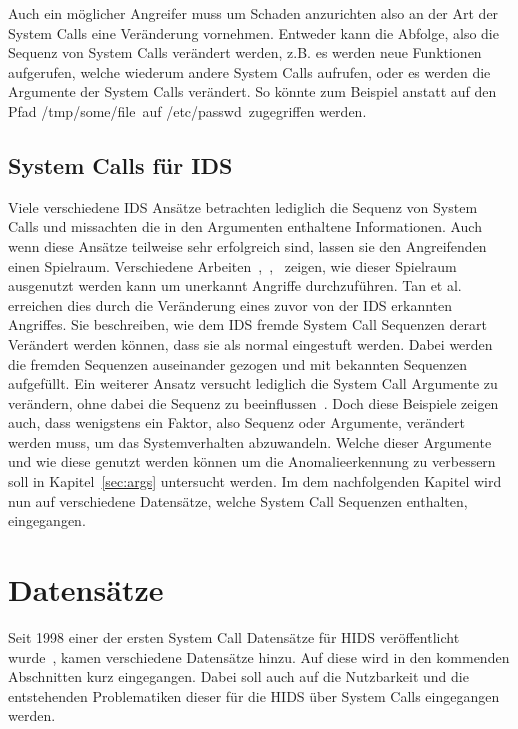         Auch ein möglicher Angreifer muss um Schaden anzurichten also an der Art der System Calls eine Veränderung vornehmen.
        Entweder kann die Abfolge, also die Sequenz von System Calls verändert werden, z.B. es werden neue Funktionen aufgerufen, welche wiederum andere System Calls aufrufen,
        oder es werden die Argumente der System Calls verändert.
        So könnte zum Beispiel anstatt auf den Pfad \glqq /tmp/some/file\grqq \ auf \glqq /etc/passwd\grqq \ zugegriffen werden. 

        \subsection{System Calls für IDS}
            Viele verschiedene IDS Ansätze betrachten lediglich die Sequenz von System Calls und missachten die in den Argumenten enthaltene Informationen.
            Auch wenn diese Ansätze teilweise sehr erfolgreich sind, lassen sie den Angreifenden einen Spielraum.
            Verschiedene Arbeiten~\cite{Syscallseqexploit1},~\cite{Syscallseqexploit2},~\cite{Syscallseqexploit3} zeigen, wie dieser Spielraum ausgenutzt werden kann um unerkannt Angriffe durchzuführen. 
            Tan et al.~\cite{Syscallseqexploit3} erreichen dies durch die Veränderung eines zuvor von der IDS erkannten Angriffes.
            Sie beschreiben, wie dem IDS fremde System Call Sequenzen derart Verändert werden können, dass sie als normal eingestuft werden.
            Dabei werden die fremden Sequenzen auseinander gezogen und mit bekannten Sequenzen aufgefüllt. 
            Ein weiterer Ansatz versucht lediglich die System Call Argumente zu verändern, ohne dabei die Sequenz zu beeinflussen~\cite{Syscallseqexploit1}.
            Doch diese Beispiele zeigen auch, dass wenigstens ein Faktor, also Sequenz oder Argumente, verändert werden muss, um das Systemverhalten abzuwandeln.
            Welche dieser Argumente und wie diese genutzt werden können um die Anomalieerkennung zu verbessern soll in Kapitel~\ref{sec:args} untersucht werden.
            Im dem nachfolgenden Kapitel wird nun auf verschiedene Datensätze, welche System Call Sequenzen enthalten, eingegangen.

    \section{Datensätze}\label{sec:Datensatz}
        Seit 1998 einer der ersten System Call Datensätze für HIDS veröffentlicht wurde~\cite{DARPA},
        kamen verschiedene Datensätze hinzu.
        Auf diese wird in den kommenden Abschnitten kurz eingegangen.
        Dabei soll auch auf die Nutzbarkeit und die entstehenden Problematiken dieser für die HIDS über System Calls eingegangen werden.

